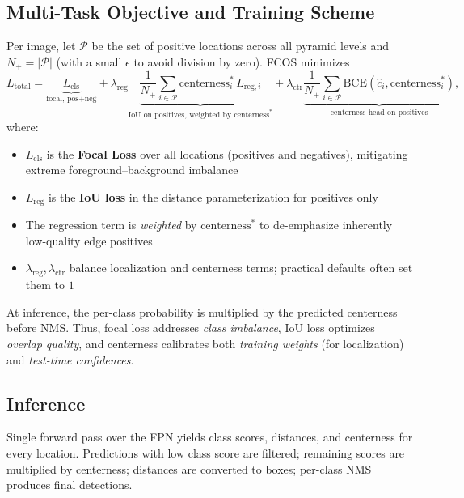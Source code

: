 \subsection{Multi-Task Objective and Training Scheme}
\label{subsec:chapter14_fcos_loss}

Per image, let \(\mathcal{P}\) be the set of positive locations across all pyramid levels and \(N_+\!=\!|\mathcal{P}|\) (with a small \(\epsilon\) to avoid division by zero). FCOS minimizes
\[
L_{\text{total}}
=\underbrace{L_{\text{cls}}}_{\text{focal, pos+neg}}
+\lambda_{\text{reg}}
\underbrace{\frac{1}{N_+}\sum_{i\in\mathcal{P}}\text{centerness}_i^\ast\,L_{\text{reg},i}}_{\text{IoU on positives, weighted by } \text{centerness}^\ast}
+\lambda_{\text{ctr}}
\underbrace{\frac{1}{N_+}\sum_{i\in\mathcal{P}} \text{BCE}(\hat{c}_i,\text{centerness}_i^\ast)}_{\text{centerness head on positives}},
\]
where:
\begin{itemize}
	\item \(L_{\text{cls}}\) is the \textbf{Focal Loss} over all locations (positives and negatives), mitigating extreme foreground–background imbalance
	\item \(L_{\text{reg}}\) is the \textbf{IoU loss} in the distance parameterization for positives only
	\item The regression term is \emph{weighted} by \(\text{centerness}^\ast\) to de-emphasize inherently low-quality edge positives
	\item \(\lambda_{\text{reg}},\lambda_{\text{ctr}}\) balance localization and centerness terms; practical defaults often set them to \(1\)
\end{itemize}
At inference, the per-class probability is multiplied by the predicted centerness before NMS. Thus, focal loss addresses \emph{class imbalance}, IoU loss optimizes \emph{overlap quality}, and centerness calibrates both \emph{training weights} (for localization) and \emph{test-time confidences}.

\subsection{Inference}
\label{subsec:chapter14_fcos_inference}

Single forward pass over the FPN yields class scores, distances, and centerness for every location. Predictions with low class score are filtered; remaining scores are multiplied by centerness; distances are converted to boxes; per-class NMS produces final detections.

